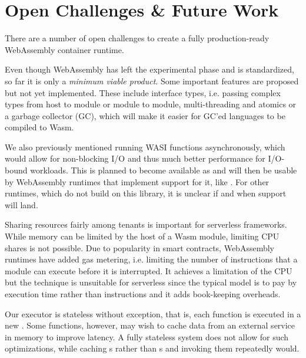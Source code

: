 

\section{Open Challenges \& Future Work}

There are a number of open challenges to create a fully production-ready WebAssembly container runtime.

Even though WebAssembly has left the experimental phase and is standardized, so far it is only a \emph{minimum viable product}. Some important features are proposed but not yet implemented. These include interface types, i.e. passing complex types from host to module or module to module, multi-threading and atomics or a garbage collector (GC), which will make it easier for GC'ed languages to be compiled to Wasm.

We also previously mentioned running WASI functions asynchronously, which would allow for non-blocking I/O and thus much better performance for I/O-bound workloads. This is planned to become available as  and will then be usable by WebAssembly runtimes that implement support for it, like . For other runtimes, which do not build on this library, it is unclear if and when support will land.

Sharing resources fairly among tenants is important for serverless frameworks. While memory can be limited by the host of a Wasm module, limiting CPU shares is not possible. Due to popularity in smart contracts, WebAssembly runtimes have added gas metering, i.e. limiting the number of instructions that a module can execute before it is interrupted. It achieves a limitation of the CPU but the technique is unsuitable for serverless since the typical model is to pay by execution time rather than instructions and it adds book-keeping overheads.

Our executor is stateless without exception, that is, each function is executed in a new . Some functions, however, may wish to cache data from an external service in memory to improve latency. A fully stateless system does not allow for such optimizations, while caching s rather than s and invoking them repeatedly would.

